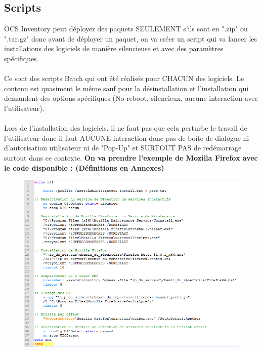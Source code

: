 \documentclass[11pt,a4paper,oneside]{article}
\begin{document}
\subsection{Scripts}

OCS Inventory peut déployer des paquets SEULEMENT s'ils sont en ".zip" ou ".tar.gz" donc avant de déployer un paquet, on va créer un script qui va lancer les installations des logiciels de manière silencieuse et avec des paramètres spécifiques.
\\ \\
Ce sont des scripts Batch qui ont été réalisés pour CHACUN des logiciels. Le contenu est quasiment le même sauf pour la désinstallation et l'installation qui demandent des options spécifiques (No reboot, silencieux, aucune interaction avec l'utilisateur).
\\ \\
Lors de l'installation des logiciels, il ne faut pas que cela perturbe le travail de l'utilisateur donc il faut AUCUNE interaction donc pas de boîte de dialogue ni d'autorisation utilisateur ni de "Pop-Up" et SURTOUT PAS de redémarrage surtout dans ce contexte.
\newpage
\textbf{On va prendre l'exemple de Mozilla Firefox avec le code disponible : (Définitions en Annexes)}
\\
\begin{figure}[hbtp]
 \centering
 \includegraphics[scale=0.84]{Script/Firefox_annexes.PNG}
 \end{figure}  
\end{document}
